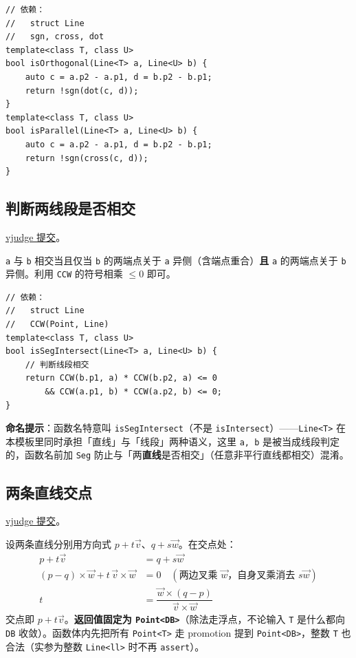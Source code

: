 		\begin{verbatim}
// 依赖：
//   struct Line
//   sgn, cross, dot
template<class T, class U>
bool isOrthogonal(Line<T> a, Line<U> b) {
	auto c = a.p2 - a.p1, d = b.p2 - b.p1;
	return !sgn(dot(c, d));
}
template<class T, class U>
bool isParallel(Line<T> a, Line<U> b) {
	auto c = a.p2 - a.p1, d = b.p2 - b.p1;
	return !sgn(cross(c, d));
}
		\end{verbatim}

		\subsection{判断两线段是否相交}

		\href{https://vjudge.net/solution/64175810}{vjudge 提交}。

		\texttt{a} 与 \texttt{b} 相交当且仅当 \texttt{b} 的两端点关于 \texttt{a} 异侧（含端点重合）\textbf{且} \texttt{a} 的两端点关于 \texttt{b} 异侧。利用 \texttt{CCW} 的符号相乘 $\le 0$ 即可。

		\begin{verbatim}
// 依赖：
//   struct Line
//   CCW(Point, Line)
template<class T, class U>
bool isSegIntersect(Line<T> a, Line<U> b) {
	// 判断线段相交
	return CCW(b.p1, a) * CCW(b.p2, a) <= 0
	    && CCW(a.p1, b) * CCW(a.p2, b) <= 0;
}
		\end{verbatim}

		\textbf{命名提示}：函数名特意叫 \texttt{isSegIntersect}（不是 \texttt{isIntersect}）——\texttt{Line<T>} 在本模板里同时承担「直线」与「线段」两种语义，这里 \texttt{a, b} 是被当成线段判定的，函数名前加 \texttt{Seg} 防止与「两\textbf{直线}是否相交」（任意非平行直线都相交）混淆。

		\subsection{两条直线交点}

		\href{https://vjudge.net/solution/64186810}{vjudge 提交}。

		设两条直线分别用方向式 $p + t\vec{v}$、$q + s\vec{w}$。在交点处：
		\begin{align*}
			p + t\vec{v} &= q + s\vec{w} \\
			(p - q) \times \vec{w} + t\, \vec{v} \times \vec{w} &= 0 \quad (\text{两边叉乘 } \vec{w}\text{，自身叉乘消去 } s\vec{w}) \\
			t &= \dfrac{\vec{w} \times (q - p)}{\vec{v} \times \vec{w}}
		\end{align*}
		交点即 $p + t\vec{v}$。\textbf{返回值固定为 \texttt{Point<DB>}}（除法走浮点，不论输入 \texttt{T} 是什么都向 \texttt{DB} 收敛）。函数体内先把所有 \texttt{Point<T>} 走 promotion 提到 \texttt{Point<DB>}，整数 \texttt{T} 也合法（实参为整数 \texttt{Line<ll>} 时不再 \texttt{assert}）。

